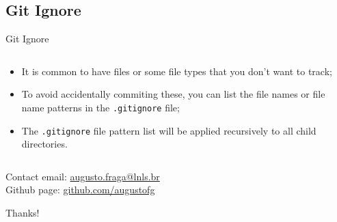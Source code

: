 \documentclass{beamer}
\begin{document}
\subsection{Git Ignore}
\begin{frame}{Git Ignore}
  \begin{columns}
    \begin{column}{0.6\textwidth}
      \begin{itemize}
        \item It is common to have files or some file types that you don't want to track;
        \item To avoid accidentally commiting these, you can list the file names or file name patterns in the \texttt{.gitignore} file;
        \item The \texttt{.gitignore} file pattern list will be applied recursively to all child directories.
      \end{itemize}
    \end{column}
    \begin{column}{0.4\textwidth}
      \begin{flushright}
        
      \end{flushright}
    \end{column}
  \end{columns}
\end{frame}

\begin{frame}{Contact}
  email: \href{mailto:augusto.fraga@lnls.br}{augusto.fraga@lnls.br} \\
  Github page: \url{github.com/augustofg}
  \begin{center}
    Thanks!
  \end{center}
\end{frame}
\end{document}

